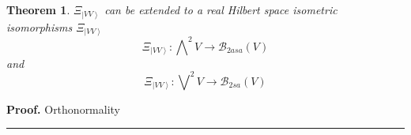 \documentclass[aps,preprint]{revtex4}%
\newtheorem{theorem}{Theorem}
\newenvironment{proof}[1][Proof]{\noindent\textbf{#1.} }{\ \rule{0.5em}{0.5em}}
\begin{document}
\begin{theorem}
$\mathcal{\Xi}_{\left\vert VV\right\rangle }$ can be extended to a \emph{real}
Hilbert space isometric isomorphisms $\mathcal{\Xi}_{\left\vert
VV\right\rangle }$
\begin{equation}
\mathcal{\Xi}_{\left\vert VV\right\rangle }:%
{\textstyle\bigwedge\nolimits^{2}}
V\rightarrow\mathcal{B}_{2asa}\left(  V\right)
\end{equation}
and
\begin{equation}
\mathcal{\Xi}_{\left\vert VV\right\rangle }:%
{\textstyle\bigvee\nolimits^{2}}
V\rightarrow\mathcal{B}_{2sa}\left(  V\right)
\end{equation}

\end{theorem}

\begin{proof}
Orthonormality
\end{proof}
\end{document}
